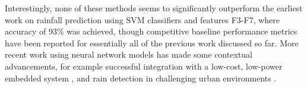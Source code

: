 Interestingly, none of these methods seems to significantly outperform
the earliest work on rainfall prediction \cite{quteprints82848} using
SVM classifiers and features F3-F7, where accuracy of 93\% was
achieved, though competitive baseline performance metrics have been
reported for essentially all of the previous work discussed so
far. More recent work using neural network models has made some
contextual advancements, for example successful integration with a
low-cost, low-power embedded system \cite{Avanzato_Fransesco_et_al.},
and rain detection in challenging urban environments \cite{s22093504}.

